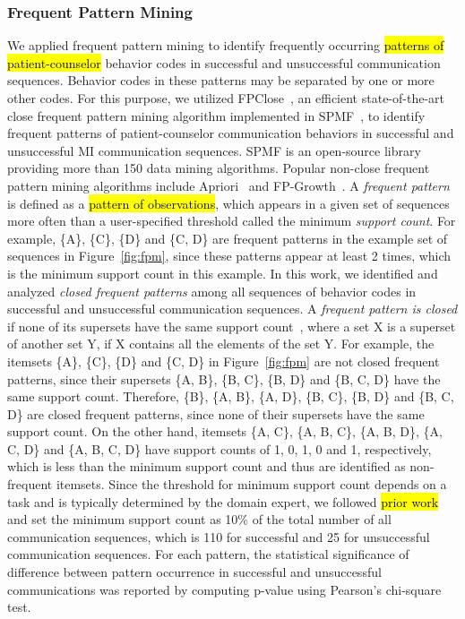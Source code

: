 \documentclass[smallextended]{svjour3}       %
\begin{document}
\subsubsection{Frequent Pattern Mining}
\label{subsubsec:frequentPatternMining}
We applied frequent pattern mining to identify frequently occurring \hl{patterns of patient-counselor} behavior codes in successful and unsuccessful communication sequences. Behavior codes in these patterns may be separated by one or more other codes. For this purpose, we utilized FPClose~\cite{grahne2005fast}, an efficient state-of-the-art close frequent pattern mining algorithm implemented in SPMF~\cite{fournier2014spmf, fournier2016spmf}, to identify frequent patterns of patient-counselor communication behaviors in successful and unsuccessful MI communication sequences. SPMF is an open-source library providing more than 150 data mining algorithms. Popular non-close frequent pattern mining algorithms include Apriori~\cite{agrawal1994fast} and FP-Growth~\cite{han2000mining}. A \textit{frequent pattern} is defined as a \hl{pattern of observations}, which appears in a given set of sequences more often than a user-specified threshold called the minimum \textit{support count}. For example, \{A\}, \{C\}, \{D\} and \{C, D\} are frequent patterns in the example set of sequences in Figure~\ref{fig:fpm}, since these patterns appear at least 2 times, which is the minimum support count in this example. In this work, we identified and analyzed \textit{closed frequent patterns} among all sequences of behavior codes in successful and unsuccessful communication sequences. A \textit{frequent pattern is closed} if none of its supersets have the same support count~\cite{pasquier1999discovering}, where a set X is a superset of another set Y, if X contains all the elements of the set Y. For example, the itemsets \{A\}, \{C\}, \{D\} and \{C, D\} in Figure~\ref{fig:fpm} are not closed frequent patterns, since their supersets \{A, B\}, \{B, C\}, \{B, D\} and \{B, C, D\} have the same support count. Therefore, \{B\}, \{A, B\}, \{A, D\}, \{B, C\}, \{B, D\} and \{B, C, D\} are closed frequent patterns, since none of their supersets have the same support count. On the other hand, itemsets \{A, C\}, \{A, B, C\}, \{A, B, D\}, \{A, C, D\} and \{A, B, C, D\} have support counts of 1, 0, 1, 0 and 1, respectively, which is less than the minimum support count and thus are identified as non-frequent itemsets. Since the threshold for minimum support count depends on a task and is typically determined by the domain expert, we followed \hl{prior work}~\cite{moradi2017quantifying, liu1999mining} and set the minimum support count as 10\% of the total number of all communication sequences, which is 110 for successful and 25 for unsuccessful communication sequences. For each pattern, the statistical significance of difference between pattern occurrence in successful and unsuccessful communications was reported by computing p-value using Pearson's chi-square test.  
\end{document}
